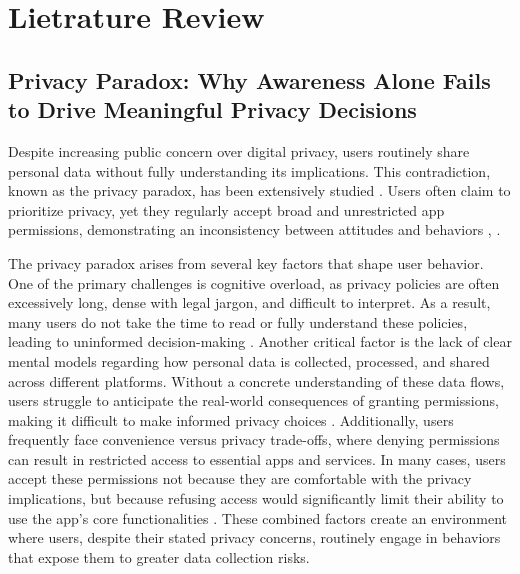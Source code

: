 \documentclass[acmlarge, nonacm]{acmart}
\begin{document}

\section{Lietrature Review}

\subsection{Privacy Paradox: Why Awareness Alone Fails to Drive Meaningful Privacy Decisions}

Despite increasing public concern over digital privacy, users routinely share personal data without fully understanding its implications. This contradiction, known as the privacy paradox, has been extensively studied \cite{Gerber2018Explaining}. Users often claim to prioritize privacy, yet they regularly accept broad and unrestricted app permissions, demonstrating an inconsistency between attitudes and behaviors \cite{barth2017privacy}, \cite{baruh2017big}.

The privacy paradox arises from several key factors that shape user behavior. One of the primary challenges is cognitive overload, as privacy policies are often excessively long, dense with legal jargon, and difficult to interpret. As a result, many users do not take the time to read or fully understand these policies, leading to uninformed decision-making \cite{Obar2018The}. Another critical factor is the lack of clear mental models regarding how personal data is collected, processed, and shared across different platforms. Without a concrete understanding of these data flows, users struggle to anticipate the real-world consequences of granting permissions, making it difficult to make informed privacy choices \cite{balebako2022nudging}. Additionally, users frequently face convenience versus privacy trade-offs, where denying permissions can result in restricted access to essential apps and services. In many cases, users accept these permissions not because they are comfortable with the privacy implications, but because refusing access would significantly limit their ability to use the app’s core functionalities \cite{Fleischhauer2022Paradox}. These combined factors create an environment where users, despite their stated privacy concerns, routinely engage in behaviors that expose them to greater data collection risks.
\end{document}
